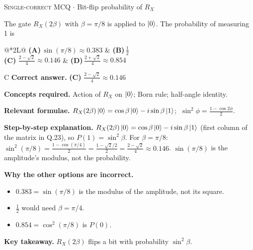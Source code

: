 \documentclass[11pt,a4paper]{article}
\newcommand{\optlabel}[1]{\textbf{(#1)}}
\newcommand{\correctlabel}[1]{\textcolor{okgreen}{\textbf{(#1)}\,\ding{51}}}
\newenvironment{qitem}[1]{\begin{list}{}{\setlength{\leftmargin}{3.3em}\setlength{\labelwidth}{3.1em}%
  \setlength{\labelsep}{0.2em}\setlength{\topsep}{3pt}\setlength{\parsep}{3pt}}\item[\textbf{Q.#1}\hfill]}{\end{list}}
\newcommand{\qsep}{\par\vspace{2pt}{\color{black!15}\hrule}\vspace{4pt}}
\newcommand{\qmeta}[2]{{\footnotesize\color{black!60}\textsc{#1} \;$\cdot$\; #2}\par}
\begin{document}
\begin{qitem}{33}
\qmeta{Single-correct MCQ}{Bit-flip probability of $R_X$}
The gate $R_X(2\beta)$ with $\beta = \pi/8$ is applied to $\ket0$. The probability of measuring 1 is
\par\smallskip\noindent\begin{tabularx}{\linewidth}{@{}*{2}{L}@{}}
\optlabel{A}\,$\sin(\pi/8) \approx 0.383$ & \optlabel{B}\,$\tfrac12$ \\[3pt]
\correctlabel{C}\,$\tfrac{2 - \sqrt2}{4} \approx 0.146$ & \optlabel{D}\,$\tfrac{2 + \sqrt2}{4} \approx 0.854$
\end{tabularx}
\end{qitem}
\begin{solbox}{C}
\textbf{\color{brand}Correct answer.} \textcolor{okgreen}{\textbf{(C)}} $\tfrac{2 - \sqrt2}{4} \approx 0.146$

\textbf{\color{brand}Concepts required.} Action of $R_X$ on $\ket0$; Born rule; half-angle identity.

\textbf{\color{brand}Relevant formulae.} $R_X(2\beta)\ket0 = \cos\beta\ket0 - i\sin\beta\ket1$; $\ \sin^2\phi = \tfrac{1 - \cos2\phi}{2}$.

\textbf{\color{brand}Step-by-step explanation.} $R_X(2\beta)\ket0 = \cos\beta\ket0 - i\sin\beta\ket1$ (first column of the matrix in Q.23), so $P(1) = \sin^2\beta$.
For $\beta = \pi/8$: $\sin^2(\pi/8) = \tfrac{1 - \cos(\pi/4)}{2} = \tfrac{1 - \sqrt2/2}{2} = \tfrac{2 - \sqrt2}{4} \approx 0.146$.
$\sin(\pi/8)$ is the amplitude's modulus, not the probability.

\textbf{\color{brand}Why the other options are incorrect.}
\begin{itemize}[leftmargin=2.4em, itemsep=1pt, topsep=2pt]
\item[\textbf{(A)}] $0.383 = \sin(\pi/8)$ is the modulus of the amplitude, not its square.
\item[\textbf{(B)}] $\frac12$ would need $\beta = \pi/4$.
\item[\textbf{(D)}] $0.854 = \cos^2(\pi/8)$ is $P(0)$.
\end{itemize}
\textbf{\color{brand}Key takeaway.} $R_X(2\beta)$ flips a bit with probability $\sin^2\beta$.
\end{solbox}
\qsep
\end{document}
